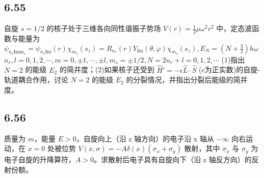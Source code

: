 \subsection{6.55}
自旋 $s=1/2$ 的核子处于三维各向同性谐振子势场 $V(r) = \frac{1}{2} \mu \omega^2 r^2$ 中，定态波函数与能量为 $\psi_{n_r \text{Imm}_s} = \psi_{n_r \text{Im}}(r)\chi_{m_s}(s_z) = R_{n_r}(r)Y_{\text{Im}}(\theta,\varphi)\chi_{m_s}(s_z), E_N = \left( N + \frac{3}{2} \right) h \omega$ $n_r,l=0,1,2,\cdots,m=0,\pm1,\cdots,\pm l,m_s=\pm1/2,N=2n_r+l=0,1,2,\cdots$ (1)指出 $N=2$ 的能级 $E_2$ 的简并度；(2)如果核子还受到 $\hat{H}' = -\epsilon \hat{L} \cdot \hat{S}$ (c为正实数)的自旋-轨道耦合作用，讨论 $N=2$ 的能级 $E_2$ 的分裂情况，并指出分裂后能级的简并度。

\subsection{6.56}
质量为 $m$，能量 $E > 0$，自旋向上（沿 z 轴方向）的电子沿 x 轴从 $-\infty$ 向右运动，在 $x = 0$ 处被位势 $V(x, \sigma) = -A \delta (x)(\sigma_x + \sigma_y)$ 散射，其中 $\sigma_x$ 与 $\sigma_y$ 为电子自旋的升降算符，$A > 0$。求散射后电子具有自旋向下（沿 z 轴反方向）的反射份额。
